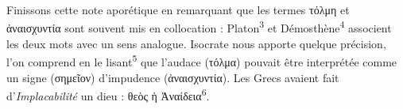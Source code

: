 \documentclass[12pt]{book}%
\newcommand{\italique}[1]{\textit{#1}}%
\newcommand{\citComm}[1]{\begin{quoting}[vskip=0pt] #1 \end{quoting}}%
\newcommand{\latin}[1]{{\policeLat #1}}%
\newcommand{\allemand}[1]{{\policeAll #1}}%
\newcommand{\marqueur}[1]{\textsuperscript{#1}}%
\newcommand{\eff}[1]{%
{\color{orange}#1}%
}%
\newenvironment{groupe}{%
\pstart%
\ledgroup%
}{%
\pend %
}%
\begin{document}
\begin{pages}
\begin{Leftside}
\begin{groupe}
{{Finissons cette note aporétique en remarquant que les termes τόλμη et ἀναισχυντία sont souvent mis en collocation : Platon\marqueur{3} et Démosthène\marqueur{4} associent les deux mots avec un sens analogue. Isocrate nous apporte quelque précision, l'on comprend en le lisant\marqueur{5} que l'audace (τόλμα) pouvait être interprétée comme un signe (σημεῖον) d'impudence (ἀναισχυντία). Les Grecs avaient fait d'\italique{Implacabilité} un dieu : θεὸς ἡ Ἀναίδεια\marqueur{6}.
}}
\end{groupe}
\end{Leftside}
\end{pages}
\end{document}

